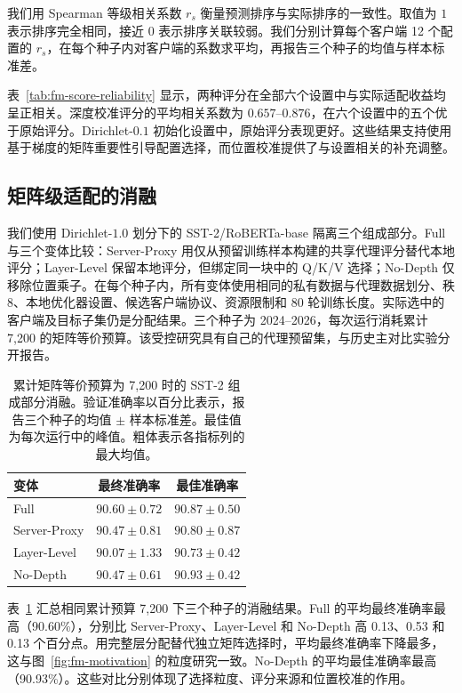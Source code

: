 \documentclass[10pt,conference,letterpaper]{IEEEtran}
\begin{document}
我们用 Spearman 等级相关系数 $r_s$ 衡量预测排序与实际排序的一致性。取值为 $1$ 表示排序完全相同，接近 $0$ 表示排序关联较弱。我们分别计算每个客户端 12 个配置的 $r_s$，在每个种子内对客户端的系数求平均，再报告三个种子的均值与样本标准差。



表~\ref{tab:fm-score-reliability} 显示，两种评分在全部六个设置中与实际适配收益均呈正相关。深度校准评分的平均相关系数为 $0.657$--$0.876$，在六个设置中的五个优于原始评分。Dirichlet-$0.1$ 初始化设置中，原始评分表现更好。这些结果支持使用基于梯度的矩阵重要性引导配置选择，而位置校准提供了与设置相关的补充调整。

\subsection{矩阵级适配的消融}\label{sec:fm-ablations}
我们使用 Dirichlet-$1.0$ 划分下的 SST-2/RoBERTa-base 隔离三个组成部分。Full 与三个变体比较：Server-Proxy 用仅从预留训练样本构建的共享代理评分替代本地评分；Layer-Level 保留本地评分，但绑定同一块中的 Q/K/V 选择；No-Depth 仅移除位置乘子。在每个种子内，所有变体使用相同的私有数据与代理数据划分、秩 8、本地优化器设置、候选客户端协议、资源限制和 80 轮训练长度。实际选中的客户端及目标子集仍是分配结果。三个种子为 2024--2026，每次运行消耗累计 7,200 的矩阵等价预算。该受控研究具有自己的代理预留集，与历史主对比实验分开报告。

\begin{table}[t]
\centering
\caption{累计矩阵等价预算为 7,200 时的 SST-2 组成部分消融。验证准确率以百分比表示，报告三个种子的均值 $\pm$ 样本标准差。最佳值为每次运行中的峰值。粗体表示各指标列的最大均值。}
\label{tab:fm-ablations}
\small
\setlength{\tabcolsep}{4pt}
\begin{tabular}{@{}lcc@{}}
\toprule
变体 & 最终准确率 & 最佳准确率 \\
\midrule
Full & $\mathbf{90.60}\pm0.72$ & $90.87\pm0.50$ \\
Server-Proxy & $90.47\pm0.81$ & $90.80\pm0.87$ \\
Layer-Level & $90.07\pm1.33$ & $90.73\pm0.42$ \\
No-Depth & $90.47\pm0.61$ & $\mathbf{90.93}\pm0.42$ \\
\bottomrule
\end{tabular}
\end{table}

表~\ref{tab:fm-ablations} 汇总相同累计预算 7,200 下三个种子的消融结果。Full 的平均最终准确率最高（90.60\%），分别比 Server-Proxy、Layer-Level 和 No-Depth 高 0.13、0.53 和 0.13 个百分点。用完整层分配替代独立矩阵选择时，平均最终准确率下降最多，这与图~\ref{fig:fm-motivation} 的粒度研究一致。No-Depth 的平均最佳准确率最高（90.93\%）。这些对比分别体现了选择粒度、评分来源和位置校准的作用。
\end{document}

